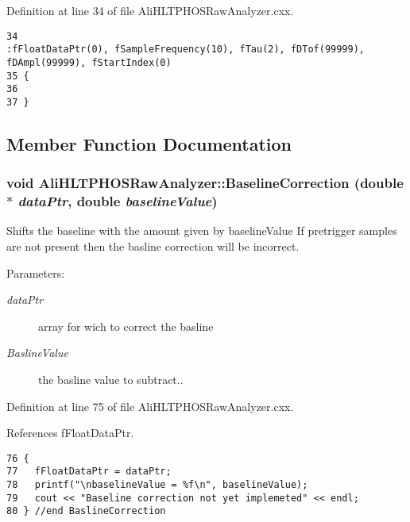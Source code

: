 Definition at line 34 of file Ali\-HLTPHOSRaw\-Analyzer.cxx.

\footnotesize\begin{verbatim}34                                                                         :fFloatDataPtr(0), fSampleFrequency(10), fTau(2), fDTof(99999), fDAmpl(99999), fStartIndex(0)
35 {
36 
37 }
\end{verbatim}\normalsize 




\subsection{Member Function Documentation}
\subsubsection{\setlength{\rightskip}{0pt plus 5cm}void Ali\-HLTPHOSRaw\-Analyzer::Baseline\-Correction (double $\ast$ {\em data\-Ptr}, double {\em baseline\-Value})}\label{classAliHLTPHOSRawAnalyzer_AliHLTPHOSRawAnalyzerPeakFindera8}


Shifts the baseline with the amount given by baseline\-Value If pretrigger samples are not present then the basline correction will be incorrect. \begin{Desc}
\item[Parameters:]
\begin{description}
\item[{\em data\-Ptr}]array for wich to correct the basline \item[{\em Basline\-Value}]the basline value to subtract.. \end{description}
\end{Desc}


Definition at line 75 of file Ali\-HLTPHOSRaw\-Analyzer.cxx.

References f\-Float\-Data\-Ptr.

\footnotesize\begin{verbatim}76 {
77   fFloatDataPtr = dataPtr;   
78   printf("\nbaselineValue = %f\n", baselineValue);
79   cout << "Baseline correction not yet implemeted" << endl;
80 } //end BaslineCorrection
\end{verbatim}\normalsize 


